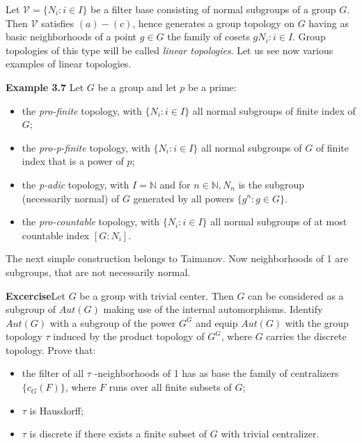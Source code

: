 \documentclass[12pt]{article}
\begin{document}
    Let $\mathcal{V} = \{N_i : i \in I\}$ be a filter base consisting of normal subgroups of a group $G$. Then $\mathcal{V}$ satisfies $(a)-(c)$,
hence generates a group topology on $G$ having as basic neighborhoods of a point $g \in G$ the family of cosets
${gN_i: i \in I}$. Group topologies of this type will be called \emph{linear topologies}. Let us see now various examples of
linear topologies.


\textbf{Example 3.7} Let $G$ be a group and let $p$ be a prime:


\begin{itemize}
    \item the \emph{pro-finite} topology, with $\{N_i : i \in I\}$ all normal subgroups of finite index of $G$;
    
    \item the \emph{pro-p-finite} topology, with $\{N_i : i \in I\}$ all normal subgroups of $G$ of finite index that is a power of $p$;

    \item the \emph{p-adic} topology, with $I = \mathbb{N}$ and for $n \in \mathbb{N}, N_n$ is the subgroup (necessarily normal)
        of $G$ generated by all powers $\{g^n : g \in G\}$.

    \item the \emph{pro-countable} topology, with $\{N_i : i \in I\}$ all normal subgroups of at most countable index $[G : N_i]$.

\end{itemize}


The next simple construction belongs to Taimanov. Now neighborhoods of 1 are subgroups, that are not necessarily normal.

\textbf{Excercise}Let $G$ be a group with trivial center. Then $G$ can be considered as a subgroup of $Aut (G)$ making
    use of the internal automorphisms. Identify $Aut (G)$ with a subgroup of the power $G^G$ and equip $Aut (G)$ with
    the group topology $\tau$ induced by the product topology of $G^G$, where $G$ carries the discrete topology. Prove that:


    \begin{itemize}

        \item the filter of all $\tau$ -neighborhoods of 1 has as base the family of centralizers $\{c_G(F)\}$, where $F$ runs over all
        finite subsets of $G$;
        
        \item $\tau$ is Hausdorff;
        
        \item $\tau$ is discrete if there exists a finite subset of $G$ with trivial centralizer.

    \end{itemize}
\end{document}
